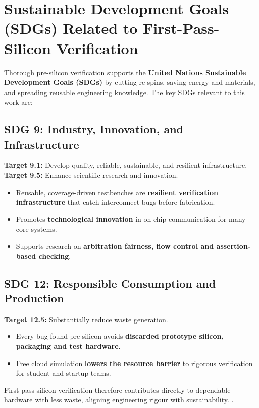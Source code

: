 \documentclass[11pt,a4paper]{report}  %
\begin{document}
\section{Sustainable Development Goals (SDGs) Related to First-Pass-Silicon Verification}

Thorough pre-silicon verification supports the \textbf{United Nations Sustainable Development Goals (SDGs)} by cutting re-spins, saving energy and materials, and spreading reusable engineering knowledge. The key SDGs relevant to this work are:

\subsection{SDG 9: Industry, Innovation, and Infrastructure}
\textbf{Target 9.1:} Develop quality, reliable, sustainable, and resilient infrastructure. \\
\textbf{Target 9.5:} Enhance scientific research and innovation.

\begin{itemize}
    \item Reusable, coverage-driven testbenches are \textbf{resilient verification infrastructure} that catch interconnect bugs before fabrication.
    \item Promotes \textbf{technological innovation} in on-chip communication for many-core systems.
    \item Supports research on \textbf{arbitration fairness, flow control and assertion-based checking}.
\end{itemize}

\subsection{SDG 12: Responsible Consumption and Production}
\textbf{Target 12.5:} Substantially reduce waste generation.

\begin{itemize}
    \item Every bug found pre-silicon avoids \textbf{discarded prototype silicon, packaging and test hardware}.
    \item Free cloud simulation \textbf{lowers the resource barrier} to rigorous verification for student and startup teams.
\end{itemize}

First-pass-silicon verification therefore contributes directly to dependable
hardware with less waste, aligning engineering rigour with sustainability.
.
\end{document}
